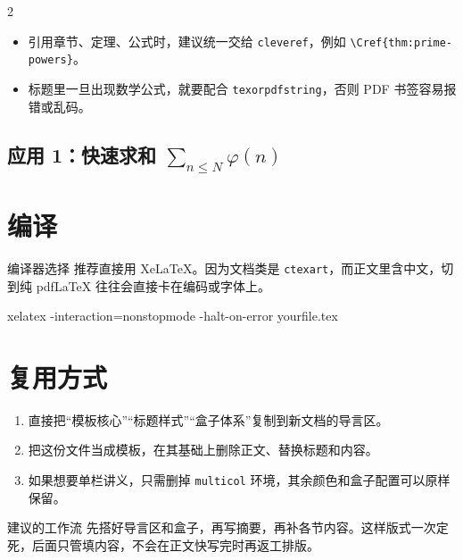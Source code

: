 \documentclass[11pt,a4paper]{ctexart}
\begin{document}
\begin{multicols}{2}
\begin{itemize}
\item 引用章节、定理、公式时，建议统一交给 \texttt{cleveref}，例如 \texttt{\textbackslash Cref\{thm:prime-powers\}}。
\item 标题里一旦出现数学公式，就要配合 \texttt{texorpdfstring}，否则 PDF 书签容易报错或乱码。
\end{itemize}

\begin{codeblock}
\subsection{应用 1：快速求和
\texorpdfstring{$\sum_{n\le N}\varphi(n)$}{Sigma phi(n)}}
\end{codeblock}

\section{编译}

\begin{warningbox}{编译器选择}
推荐直接用 XeLaTeX。因为文档类是 \texttt{ctexart}，而正文里含中文，切到纯 pdfLaTeX 往往会直接卡在编码或字体上。
\end{warningbox}

\begin{codeblock}
xelatex -interaction=nonstopmode -halt-on-error yourfile.tex
\end{codeblock}

\section{复用方式}

\begin{enumerate}
\item 直接把“模板核心”“标题样式”“盒子体系”复制到新文档的导言区。
\item 把这份文件当成模板，在其基础上删除正文、替换标题和内容。
\item 如果想要单栏讲义，只需删掉 \texttt{multicol} 环境，其余颜色和盒子配置可以原样保留。
\end{enumerate}

\begin{ideabox}{建议的工作流}
先搭好导言区和盒子，再写摘要，再补各节内容。这样版式一次定死，后面只管填内容，不会在正文快写完时再返工排版。
\end{ideabox}

\end{multicols}
\end{document}
